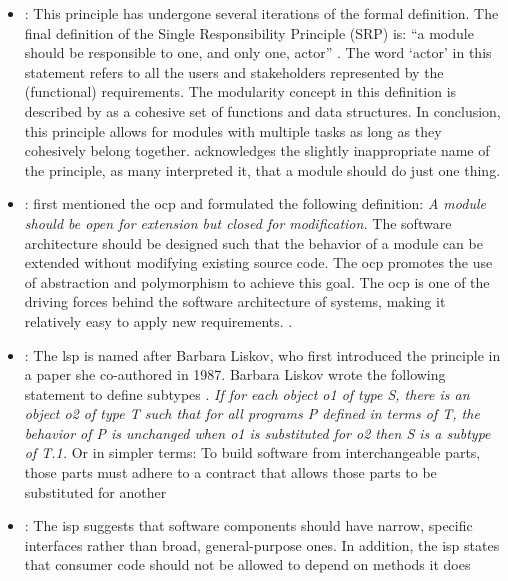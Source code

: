 \begin{itemize}
    \item {}: This principle has undergone several iterations of the formal
    definition. The final definition of the Single Responsibility Principle (SRP) is:
    \enquote{a module should be responsible to one, and only one, actor}
    \textcite[82]{r_c_martin_clean_2018}. The word \enquote*{actor} in this statement refers to all
    the users and stakeholders represented by the (functional) requirements. The
    modularity concept in this definition is described by
    \textcite[82]{r_c_martin_clean_2018} as a cohesive set of functions and data
    structures. In conclusion, this principle allows for modules with multiple tasks as
    long as they cohesively belong together. \textcite[81]{r_c_martin_clean_2018}
    acknowledges the slightly inappropriate name of the principle, as many interpreted it,
    that a module should do just one thing.
    \item {}: \textcite{meyer_object-oriented_1988} first mentioned the
    \gls{ocp} and formulated the following definition: \textit{A module should be open for
    extension but closed for modification.} The software architecture should be designed
    such that the behavior of a module can be extended without modifying existing source
    code. The \gls{ocp} promotes the use of abstraction and polymorphism to achieve this
    goal. The \gls{ocp} is one of the driving forces behind the software architecture of
    systems, making it relatively easy to apply new requirements.
    \parencite[94]{r_c_martin_clean_2018}.
    \item {}: The \gls{lsp} is named after Barbara Liskov, who first introduced
    the principle in a paper she co-authored in 1987. Barbara Liskov wrote the following
    statement to define subtypes \textcite[92]{r_c_martin_clean_2018}. \textit{If for each
    object o1 of type S, there is an object o2 of type T such that for all programs P
    defined in terms of T, the behavior of P is unchanged when o1 is substituted for o2
    then S is a subtype of T.1.} Or in simpler terms: To build software from
    interchangeable parts, those parts must adhere to a contract that allows those parts
    to be substituted for another \textcite[80]{r_c_martin_clean_2018}
    \item {}: The \gls{isp} suggests that software components should have
    narrow, specific interfaces rather than broad, general-purpose ones. In addition, the
    \gls{isp} states that consumer code should not be allowed to depend on methods it does

\end{itemize}
